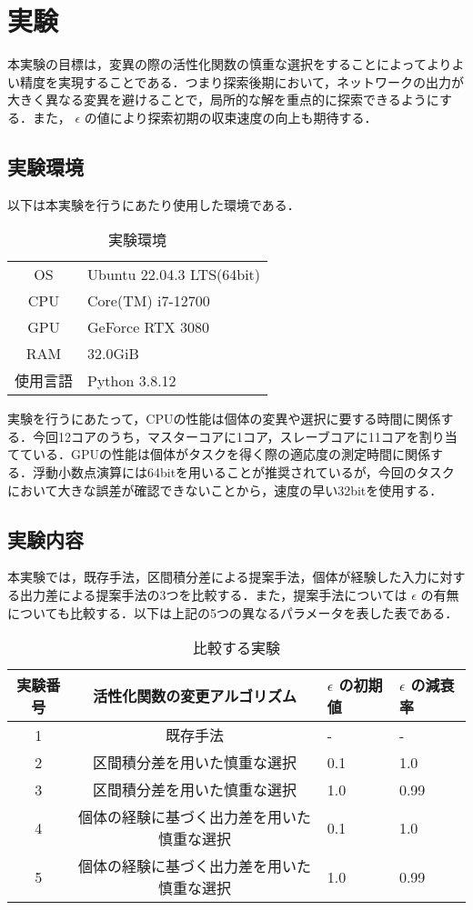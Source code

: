 \section{実験}
本実験の目標は，変異の際の活性化関数の慎重な選択をすることによってよりよい精度を実現することである．つまり探索後期において，ネットワークの出力が大きく異なる変異を避けることで，局所的な解を重点的に探索できるようにする．また， $ \epsilon $ の値により探索初期の収束速度の向上も期待する．

\subsection{実験環境}
以下は本実験を行うにあたり使用した環境である．

\begin{table}[h]
    \caption{実験環境}
    \centering
    \begin{tabular}{cl}
        \hline
        OS & Ubuntu 22.04.3 LTS(64bit) \\
        CPU & Core(TM) i7-12700 \\
        GPU & GeForce RTX 3080 \\
        RAM & 32.0GiB \\
        使用言語 & Python 3.8.12 \\
        \hline
    \end{tabular}
\end{table}

実験を行うにあたって，CPUの性能は個体の変異や選択に要する時間に関係する．今回12コアのうち，マスターコアに1コア，スレーブコアに11コアを割り当てている．GPUの性能は個体がタスクを得く際の適応度の測定時間に関係する．浮動小数点演算には64bitを用いることが推奨されているが，今回のタスクにおいて大きな誤差が確認できないことから，速度の早い32bitを使用する．

\subsection{実験内容}
本実験では，既存手法，区間積分差による提案手法，個体が経験した入力に対する出力差による提案手法の3つを比較する．また，提案手法については $ \epsilon $ の有無についても比較する．以下は上記の5つの異なるパラメータを表した表である．

\begin{table}[h]
    \caption{比較する実験}
    \centering
    \begin{tabular}{ccll}
        \hline
        実験番号  & 活性化関数の変更アルゴリズム & $ \epsilon $ の初期値 & $ \epsilon $ の減衰率 \\
        \hline \hline
        1 & 既存手法 & - & - \\
        2 & 区間積分差を用いた慎重な選択 & 0.1 & 1.0 \\
        3 & 区間積分差を用いた慎重な選択 & 1.0 & 0.99 \\
        4 & 個体の経験に基づく出力差を用いた慎重な選択 & 0.1 & 1.0 \\
        5 & 個体の経験に基づく出力差を用いた慎重な選択 & 1.0 & 0.99 \\
        \hline
    \end{tabular}
\end{table}


